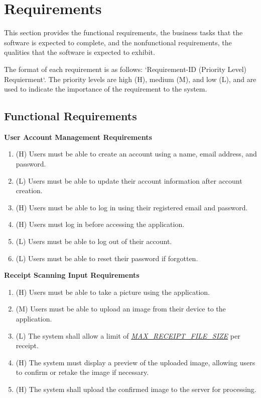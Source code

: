 \documentclass[12pt]{article}
\begin{document}
\newpage


\section{Requirements}

This section provides the functional requirements, the business tasks that the
software is expected to complete, and the nonfunctional requirements, the
qualities that the software is expected to exhibit.

The format of each requirement is as follows: `Requirement-ID (Priority Level)
Requierment`. The priority levels are high (H), medium (M), and low (L), and are
used to indicate the importance of the requirement to the system.

\subsection{Functional Requirements}\label{sec_funcReq}

\textbf{User Account Management Requirements}\label{FR-UAM}
\begin{enumerate}[label=FR-UAM-\arabic*]
  \item (H) Users must be able to create an account using a name, email
  address, and password.
  \item (L) Users must be able to update their account information after account
  creation.
  \item (H) Users must be able to log in using their registered email and password.
  \item (H) Users must log in before accessing the application.
  \item (L) Users must be able to log out of their account.
  \item (L) Users must be able to reset their password if forgotten.
\end{enumerate}

\textbf{Receipt Scanning Input Requirements}\label{FR-IP}
\begin{enumerate}[label=FR-IP-\arabic*]
  \item (H) Users must be able to take a picture using the application.
  \item (M) Users must be able to upload an image from their device to the
  application.
  \item (L) The system shall allow a limit of \hyperref[Table:AuxConstants]{\textit{MAX\_RECEIPT\_FILE\_SIZE}} per receipt.
  \item (H) The system must display a preview of the uploaded image, allowing users
  to confirm or retake the image if necessary. 
  \item (H) The system shall upload the confirmed image to the server for processing.
\end{enumerate}
\end{document}
